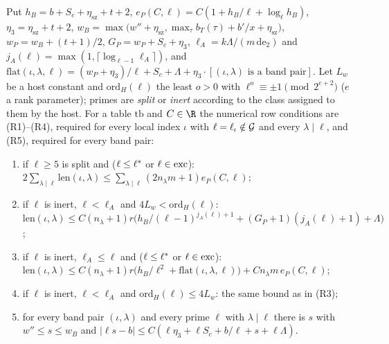 \begin{definition}\label{pf:linkN-sel:rownumdef}
Put $h_B=b+S_c+\eta_{\mathrm{sz}}+t+2$, $e_P(C,\ell)=C(1+h_B/\ell+\log_\ell h_B)$, $\eta_3=\eta_{\mathrm{sz}}+t+2$,
$w_B=\max\bigl(w''+\eta_{\mathrm{sz}},\max_{\tau}b_T(\tau)+b'/x+\eta_{\mathrm{sz}}\bigr)$, $w_P=w_B+(t+1)/2$, $G_P=w_P+S_c+\eta_3$,
$\ell_A=k\Lambda/(m\,\mathrm{de}_2)$ and $j_A(\ell)=\max(1,\lceil\log_{\ell-1}\ell_A\rceil)$, and
$\mathrm{flat}(\iota,\lambda,\ell)=(w_P+\eta_3)/\ell+S_c+\Lambda+\eta_3\cdot[\text{$(\iota,\lambda)$ is a band pair}]$. Let $L_w$ be a
host constant and $\mathrm{ord}_H(\ell)$ the least $o>0$ with $\ell^o\equiv\pm1\pmod{2^{e+2}}$ ($e$ a rank parameter); primes are
\emph{split} or \emph{inert} according to the class assigned to them by the host. For a table $\mathrm{tb}$ and $C\in\R$ the numerical
row conditions are (R1)--(R4), required for every local index $\iota$ with $\ell=\ell_\iota\notin\mathcal G$ and every $\lambda\mid\ell$,
and (R5), required for every band pair:
\begin{enumerate}[label=(R\arabic*)]
\item if $\ell\ge5$ is split and ($\ell\le\ell^{*}$ or $\ell\in\mathrm{exc}$):
$2\sum_{\lambda\mid\ell}\mathrm{len}(\iota,\lambda)\le\sum_{\lambda\mid\ell}(2n_\lambda m+1)e_P(C,\ell)$;
\item if $\ell$ is inert, $\ell<\ell_A$ and $4L_w<\mathrm{ord}_H(\ell)$:
$\mathrm{len}(\iota,\lambda)\le C(n_\lambda+1)r\bigl(h_B/(\ell-1)^{j_A(\ell)+1}+(G_P+1)(j_A(\ell)+1)+\Lambda\bigr)$;
\item if $\ell$ is inert, $\ell_A\le\ell$ and ($\ell\le\ell^{*}$ or $\ell\in\mathrm{exc}$):
$\mathrm{len}(\iota,\lambda)\le C(n_\lambda+1)r\bigl(h_B/\ell^2+\mathrm{flat}(\iota,\lambda,\ell)\bigr)+Cn_\lambda m\,e_P(C,\ell)$;
\item if $\ell$ is inert, $\ell<\ell_A$ and $\mathrm{ord}_H(\ell)\le4L_w$: the same bound as in (R3);
\item for every band pair $(\iota,\lambda)$ and every prime $\ell$ with $\lambda\mid\ell$ there is $s$ with $w''\le s\le w_B$ and
$|\ell s-b|\le C(\ell\eta_3+\ell S_c+b/\ell+s+\ell\Lambda)$.
\end{enumerate}
\end{definition}

